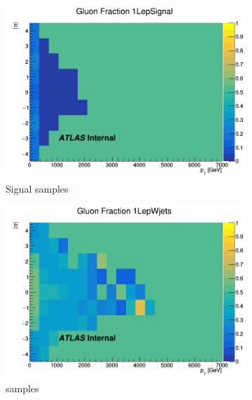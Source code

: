 

\begin{figure}[p]
    \centering
    \begin{subfigure}[b]{0.3\textwidth}
        \centering
        \includegraphics[width=\textwidth]{figures/QGfrac/GluonFrac2D_1LepSignal.png}
        \caption{Signal samples}
        \label{fig:GluonFracSignal}
    \end{subfigure}
    \hfill
    \begin{subfigure}[b]{0.3\textwidth}
        \centering
        \includegraphics[width=\textwidth]{figures/QGfrac/GluonFrac2D_1LepWjets.png}
        \caption{\Wjets samples}
        \label{fig:GluonFracWjets}
    \end{subfigure}
    \hfill
    \begin{subfigure}[b]{0.3\textwidth}

\end{subfigure}
\end{figure}
